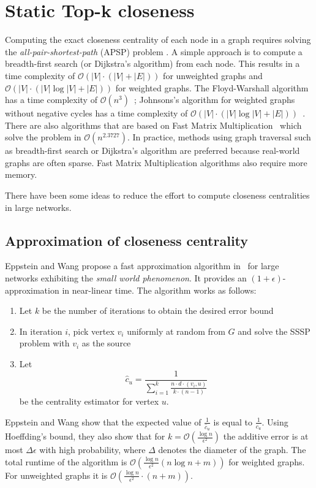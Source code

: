 \chapter{Static Top-k closeness}
\label{ch:staticCloseness}

Computing the exact closeness centrality of each node in a graph requires solving the \emph{all-pair-shortest-path} (APSP) problem . A simple approach is to compute a breadth-first search (or Dijkstra's algorithm) from each node. This results in a time complexity of $\mathcal{O}(|V| \cdot (|V| + |E|))$ for unweighted graphs and $\mathcal{O}(|V| \cdot (|V|\log{|V|} + |E|))$ for weighted graphs. The Floyd-Warshall algorithm has a time complexity of $\mathcal{O}(n^3)$~\cite{Floyd:1962:A9S:367766.368168}; Johnsons's algorithm for weighted graphs without negative cycles has a time complexity of $\mathcal{O}(|V| \cdot (|V|\log{|V|} + |E|))$~\cite{Johnson:1977:EAS:321992.321993}. There are also algorithms that are based on Fast Matrix Multiplication~\cite{zwick2002all,williams2012multiplying} which solve the problem in $\mathcal{O}(n^{2.3727})$. In practice, methods using graph traversal such as breadth-first search or Dijkstra's algorithm are preferred because real-world graphs are often sparse. Fast Matrix Multiplication algorithms also require more memory. 

There have been some ideas to reduce the effort to compute closeness centralities in large networks.

\section{Approximation of closeness centrality}
Eppstein and Wang propose a fast approximation algorithm in~\cite{eppstein2001fast} for large networks exhibiting the \emph{small world phenomenon}. It provides an $(1 + \epsilon)$-approximation in near-linear time. The algorithm works as follows:

\begin{enumerate}
	\item Let $k$ be the number of iterations to obtain the desired error bound
	\item In iteration $i$, pick vertex $v_i$ uniformly at random from $G$ and solve the SSSP problem with $v_i$ as the source
	\item Let
		\[
			\hat{c}_u = \frac{1}{\sum_{i = 1}^{k}{\frac{n \cdot d \cdot (v_i, u)}{k \cdot (n - 1)}}} 	
		\] be the centrality estimator for vertex $u$.
\end{enumerate}
Eppstein and Wang show that the expected value of $\frac{1}{\hat{c}_u}$ is equal to $\frac{1}{c_u}$. Using Hoeffding's bound, they also show that for $k = \mathcal{O}(\frac{\log{n}}{\epsilon^2})$ the additive error is at most $\Delta \epsilon$ with high probability, where $\Delta$ denotes the diameter of the graph. The total runtime of the algorithm is $\mathcal{O}\left(\frac{\log{n}}{\epsilon^2} (n \log{n} + m)\right)$ for weighted graphs. For unweighted graphs it is $\mathcal{O}\left(\frac{\log{n}}{\epsilon^2} \cdot (n + m)\right)$.

